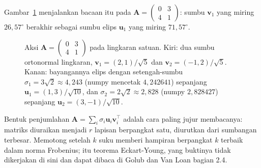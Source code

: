 Gambar~\ref{fig:svd-lingkaran-elips} menjalankan bacaan itu pada
$\mathbf{A}=\begin{pmatrix}0&3\\4&1\end{pmatrix}$: sumbu $\mathbf{v}_{1}$ yang miring
$26{,}57^\circ$ berakhir sebagai sumbu elips $\mathbf{u}_{1}$ yang miring
$71{,}57^\circ$.

\begin{figure}[htbp]
\centering
{}
\hfill
{}
\caption{Aksi $\mathbf{A}=\begin{pmatrix}0&3\\4&1\end{pmatrix}$ pada lingkaran satuan.
Kiri: dua sumbu ortonormal lingkaran, $\mathbf{v}_{1}=(2,1)/\sqrt{5}$ dan
$\mathbf{v}_{2}=(-1,2)/\sqrt{5}$. Kanan: bayangannya elips dengan setengah-sumbu
$\sigma_{1}=3\sqrt{2}\approx4{,}243$ (numpy mencetak $4{,}242641$) sepanjang
$\mathbf{u}_{1}=(1,3)/\sqrt{10}$, dan $\sigma_{2}=2\sqrt{2}\approx2{,}828$ (numpy
$2{,}828427$) sepanjang $\mathbf{u}_{2}=(3,-1)/\sqrt{10}$.}
\label{fig:svd-lingkaran-elips}
\end{figure}

Bentuk penjumlahan $\mathbf{A}=\sum_{i}\sigma_{i}\mathbf{u}_{i}\mathbf{v}_{i}^{\top}$
adalah cara paling jujur membacanya: matriks diuraikan menjadi $r$ lapisan berpangkat
satu, diurutkan dari sumbangan terbesar. Memotong setelah $k$ suku memberi hampiran
berpangkat $k$ terbaik dalam norma Frobenius; itu teorema Eckart-Young, yang buktinya
tidak dikerjakan di sini dan dapat dibaca di Golub dan Van Loan bagian 2.4.

